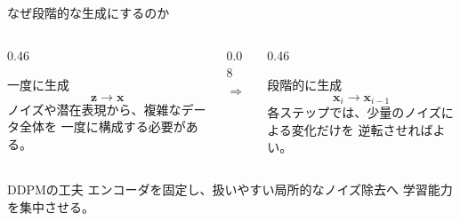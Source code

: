 \begin{frame}{なぜ段階的な生成にするのか}
    \begin{columns}[c,onlytextwidth]
        \begin{column}{0.46\textwidth}
            \begin{alertblock}{一度に生成}
                \[
                    \boldsymbol{z}\longrightarrow\boldsymbol{x}
                \]
                ノイズや潜在表現から、複雑なデータ全体を
                一度に構成する必要がある。
            \end{alertblock}
        \end{column}
        \begin{column}{0.08\textwidth}
            \centering
            \Large $\Longrightarrow$
        \end{column}
        \begin{column}{0.46\textwidth}
            \begin{exampleblock}{段階的に生成}
                \[
                    \boldsymbol{x}_i\longrightarrow\boldsymbol{x}_{i-1}
                \]
                各ステップでは、少量のノイズによる変化だけを
                逆転させればよい。
            \end{exampleblock}
        \end{column}
    \end{columns}
    \vfill
    \begin{block}{DDPMの工夫}
        エンコーダを固定し、扱いやすい局所的なノイズ除去へ
        学習能力を集中させる。
    \end{block}
\end{frame}
